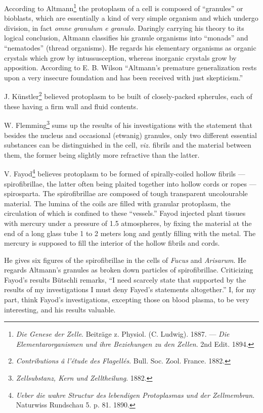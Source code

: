 \documentclass[a4paper, 12pt, oneside]{article}
\begin{document}
According to Altmann\footnote{\emph{Die Genese der Zelle}. Beiträge z. Physiol. (C. Ludwig). 1887. --- \emph{Die Elementarorganismen und ihre Beziehungen zu den Zellen}. 2nd Edit. 1894.} the protoplasm of a cell is composed of ``granules'' or bioblasts, which are essentially a kind of very simple organism and which undergo division, in fact \emph{omne granulum e granulo}. Daringly carrying his theory to its logical conclusion, Altmann classifies his granule organisms into ``monads'' and ``nematodes'' (thread organisms). He regards his elementary organisms as organic crystals which grow by intussusception, whereas inorganic crystals grow by apposition. According to E. B. Wilson ``Altmann's premature generalization rests upon a very insecure foundation and has been received with just skepticism.''

J. Künstler\footnote{\emph{Contributions â l'étude des Flagellés}. Bull. Soc. Zool. France. 1882.} believed protoplasm to be built of closely-packed spherules, each of these having a firm wall and fluid contents.

W. Flemming\footnote{\emph{Zellsubstanz, Kern und Zelltheilung}. 1882.} sums up the results of his investigations with the statement that besides the nucleus and occasional (etwanig) granules, only two different essential substances can be distinguished in the cell, \emph{viz.} fibrils and the material between them, the former being slightly more refractive than the latter.

V. Fayod\footnote{\emph{Ueber die wahre Structur des lebendigen Protoplasmas und der Zellmembran}. Naturwiss Rundschau 5. p. 81. 1890.} believes protoplasm to be formed of spirally-coiled hollow fibrils --- spirofibrillae, the latter often being plaited together into hollow cords or ropes --- spirosparta. The spirofibrillae are composed of tough transparent uncolourable material. The lumina of the coils are filled with granular protoplasm, the circulation of which is confined to these ``vessels.'' Fayod injected plant tissues with mercury under a pressure of 1.5 atmospheres, by fixing the material at the end of a long glass tube 1 to 2 meters long and gently filling with the metal. The mercury is supposed to fill the interior of the hollow fibrils and cords.

He gives six figures of the spirofibrillae in the cells of \emph{Fucus} and \emph{Arisarum}. He regards Altmann's granules as broken down particles of spirofibrillae. Criticizing Fayod's results Bütschli remarks, ``I need scarcely state that supported by the results of my investigations I must deny Fayed's statements altogether.'' I, for my part, think Fayod's investigations, excepting those on blood plasma, to be very interesting, and his results valuable.
\end{document}
